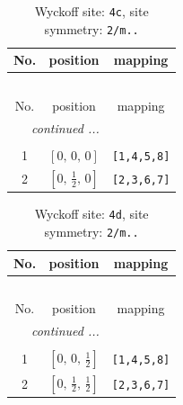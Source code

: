 \documentclass[fleqn,8pt]{jsarticle}
\begin{document}
\renewcommand{\arraystretch}{1.2}
\begin{longtable}{ccc}
\caption{Wyckoff site: {\tt 4c}, site symmetry: {\tt 2/m..}}
 \\
 \hline \hline
No. & position & mapping \\ \hline \endfirsthead

\multicolumn{2}{l}{\tablename\ \thetable{}} \\
 \hline \hline
No. & position & mapping \\ \hline \endhead

 \hline \hline
\multicolumn{2}{r}{\footnotesize\it continued ...} \\ \endfoot

 \hline \hline
\multicolumn{2}{r}{} \\ \endlastfoot

1 & $\left[ 0,\, 0,\, 0 \right]$ & {\tt [1,4,5,8]} \\ \hline
2 & $\left[ 0,\, \frac{1}{2},\, 0 \right]$ & {\tt [2,3,6,7]} \\
\end{longtable}
\renewcommand{\arraystretch}{1.2}
\begin{longtable}{ccc}
\caption{Wyckoff site: {\tt 4d}, site symmetry: {\tt 2/m..}}
 \\
 \hline \hline
No. & position & mapping \\ \hline \endfirsthead

\multicolumn{2}{l}{\tablename\ \thetable{}} \\
 \hline \hline
No. & position & mapping \\ \hline \endhead

 \hline \hline
\multicolumn{2}{r}{\footnotesize\it continued ...} \\ \endfoot

 \hline \hline
\multicolumn{2}{r}{} \\ \endlastfoot

1 & $\left[ 0,\, 0,\, \frac{1}{2} \right]$ & {\tt [1,4,5,8]} \\ \hline
2 & $\left[ 0,\, \frac{1}{2},\, \frac{1}{2} \right]$ & {\tt [2,3,6,7]} \\
\end{longtable}
\renewcommand{\arraystretch}{1.2}
\end{document}

